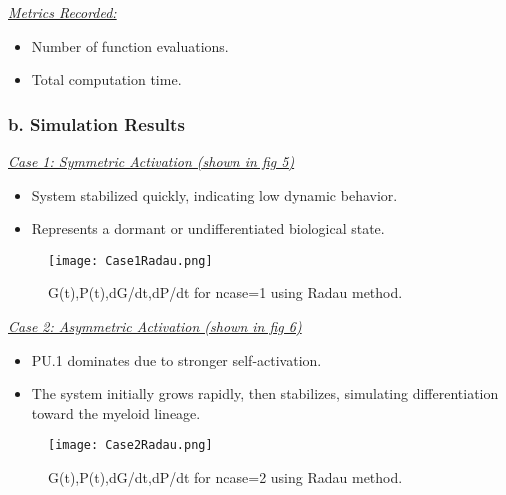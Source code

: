 \documentclass[journal]{IEEEtran}
\begin{document}
\vspace{0.5em}

\underline{\textit{Metrics Recorded:}}
\begin{itemize}
    \item Number of function evaluations.
    \item Total computation time.
\end{itemize}

\vspace{1em}

\subsubsection*{\textbf{b. Simulation Results}} \hfill

\underline{\textit{Case 1: Symmetric Activation (shown in fig 5)}}
\begin{itemize}
    \item System stabilized quickly, indicating low dynamic behavior.
    \item Represents a dormant or undifferentiated biological state.
\end{itemize}

\begin{figure}[H]%
\begin {center}
\texttt{[image: Case1Radau.png]}
\caption{ G(t),P(t),dG/dt,dP/dt for  ncase=1 using  Radau method. }
\label{fig:ecg}
\end {center}
\end{figure}
\vspace{0.5em}

\underline{\textit{Case 2: Asymmetric Activation (shown in fig 6)}}
\begin{itemize}
    \item PU.1 dominates due to stronger self-activation.
    \item The system initially grows rapidly, then stabilizes, simulating differentiation toward the myeloid lineage.
\end{itemize}

\begin{figure}[H]%
\begin {center}
\texttt{[image: Case2Radau.png]}
\caption{ G(t),P(t),dG/dt,dP/dt for  ncase=2 using Radau method. }
\label{fig:ecg}
\end {center}
\end{figure}
\vspace{1em}
\end{document}
